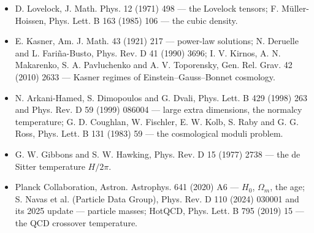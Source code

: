 \documentclass[10pt,a4paper]{article}
\begin{document}
\begin{itemize}
\item D. Lovelock, J. Math. Phys. 12 (1971) 498 — the Lovelock tensors; F. Müller-Hoissen, Phys. Lett. B 163 (1985) 106 — the cubic density.
\item E. Kasner, Am. J. Math. 43 (1921) 217 — power-law solutions; N. Deruelle and L. Fariña-Busto, Phys. Rev. D 41 (1990) 3696; I. V. Kirnos, A. N. Makarenko, S. A. Pavluchenko and A. V. Toporensky, Gen. Rel. Grav. 42 (2010) 2633 — Kasner regimes of Einstein–Gauss–Bonnet cosmology.
\item N. Arkani-Hamed, S. Dimopoulos and G. Dvali, Phys. Lett. B 429 (1998) 263 and Phys. Rev. D 59 (1999) 086004 — large extra dimensions, the normalcy temperature; G. D. Coughlan, W. Fischler, E. W. Kolb, S. Raby and G. G. Ross, Phys. Lett. B 131 (1983) 59 — the cosmological moduli problem.
\item G. W. Gibbons and S. W. Hawking, Phys. Rev. D 15 (1977) 2738 — the de Sitter temperature $H/2\pi$.
\item Planck Collaboration, Astron. Astrophys. 641 (2020) A6 — $H_0$, $\Omega_m$, the age; S. Navas et al. (Particle Data Group), Phys. Rev. D 110 (2024) 030001 and its 2025 update — particle masses; HotQCD, Phys. Lett. B 795 (2019) 15 — the QCD crossover temperature.
\end{itemize}
\end{document}
